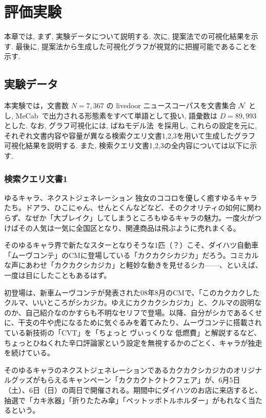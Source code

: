 \documentclass[a4paper,12pt]{jsreport}
\begin{document}
\chapter{評価実験}
本章では, まず, 実験データについて説明する.
次に, 提案法での可視化結果を示す.
最後に, 提案法から生成した可視化グラフが視覚的に把握可能であることを示す.

\section{実験データ}

本実験では，文書数 $N = 7,367$ の livedoor ニュースコーパスを文書集合 ${\cal N}$ とし, 
MeCab~\cite{kudo04}で出力される形態素をすべて単語として扱い, 語彙数は $D = 89,993$ とした.
なお, グラフ可視化には, ばねモデル法~\cite{kamada89}を採用し, 
これらの設定を元に, それぞれ文書内容や容量が異なる検索クエリ文書1,2,3を用いて生成したグラフ可視化結果を説明する.
また, 検索クエリ文書1,2,3の全内容については以下に示す.

\newpage
\subsection{検索クエリ文書1}

ゆるキャラ、ネクストジェネレーション
独女のココロを優しく癒すゆるキャラたち。ドアラ、ひこにゃん、せんとくんなどなど、そのクオリティの如何に関わらず、なぜか「大ブレイク」してしまうところもゆるキャラの魅力。一度火がつけばその人気は一気に全国区となり、関連商品は飛ぶように売れまくる。

そのゆるキャラ界で新たなスターとなりそうな1匹（？）こそ、ダイハツ自動車「ムーヴコンテ」のCMに登場している「カクカクシカジカ」だろう。コミカルな声にあわせ「カクカクシカジカ」と軽妙な動きを見せるシカ——、といえば、一度は目にしたこともあるはず。

初登場は、新車ムーヴコンテが発表された08年8月のCMで、「このカクカクしたクルマ、いいところがシカジカ。ゆえにカクカクシカジカ」と、クルマの説明なのか、自己紹介なのかすらも不明なセリフで登場。以降、自分がシカであるくせに、干支の牛や虎になるために気ぐるみを着てみたり、ムーヴコンテに搭載されている新技術の「CVT」を「ちょっと ヴぃっくりな 低燃費」と解説するなど、ちょっとひねくれた辛口評論家という設定を無視するかのごとく、キャラが独走を続けている。

そのゆるキャラのネクストジェネレーションであるカクカクシカジカのオリジナルグッズがもらえるキャンペーン「カクカクトクトクフェア」が、6月5日（土）、6日（日）の両日で開催される。期間中にダイハツのお店に来店すると、抽選で「カキ氷器」「折りたたみ傘」「ペットッボトルホルダー」がもれなく当たるという。
\end{document}
